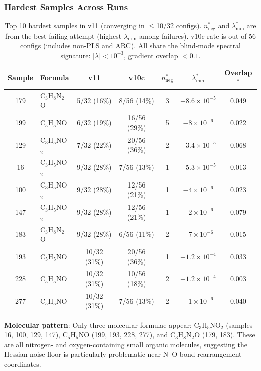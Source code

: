 \documentclass[11pt,a4paper]{article}
\theoremstyle{definition}
\begin{document}
\subsubsection{Hardest Samples Across Runs}
\label{sec:hardest}

\begin{table}[h]
\centering
\caption{Top 10 hardest samples in v11 (converging in $\leq$10/32 configs).
  $n_\text{neg}^*$ and $\lambda_\text{min}^*$ are from the best failing attempt
  (highest $\lambda_\text{min}$ among failures).  v10c rate is out of 56 configs
  (includes non-PLS and ARC).  All share the blind-mode spectral signature:
  $|\lambda| < 10^{-3}$, gradient overlap $<0.1$.}
\label{tab:hardest-10}
\begin{tabular}{clccccc}
\toprule
Sample & Formula & v11 & v10c & $n_\text{neg}^*$ & $\lambda_\text{min}^*$ & Overlap$^*$ \\
\midrule
179 & C$_3$H$_8$N$_2$O & 5/32 (16\%) & 8/56 (14\%) & 3 & $-8.6\times10^{-5}$ & 0.049 \\
199 & C$_5$H$_5$NO      & 6/32 (19\%) & 16/56 (29\%) & 5 & $-8\times10^{-6}$ & 0.022 \\
129 & C$_3$H$_5$NO$_2$  & 7/32 (22\%) & 20/56 (36\%) & 2 & $-3.4\times10^{-5}$ & 0.068 \\
16  & C$_3$H$_5$NO$_2$  & 9/32 (28\%) & 7/56 (13\%) & 1 & $-5.3\times10^{-5}$ & 0.013 \\
100 & C$_3$H$_5$NO$_2$  & 9/32 (28\%) & 12/56 (21\%) & 1 & $-4\times10^{-6}$ & 0.023 \\
147 & C$_3$H$_5$NO$_2$  & 9/32 (28\%) & 12/56 (21\%) & 1 & $-2\times10^{-6}$ & 0.079 \\
183 & C$_3$H$_8$N$_2$O  & 9/32 (28\%) & 6/56 (11\%) & 2 & $-7\times10^{-6}$ & 0.015 \\
193 & C$_5$H$_5$NO      & 10/32 (31\%) & 20/56 (36\%) & 1 & $-1.2\times10^{-4}$ & 0.033 \\
228 & C$_5$H$_5$NO      & 10/32 (31\%) & 10/56 (18\%) & 2 & $-1.2\times10^{-4}$ & 0.003 \\
277 & C$_5$H$_5$NO      & 10/32 (31\%) & 7/56 (13\%) & 2 & $-1\times10^{-6}$ & 0.040 \\
\bottomrule
\end{tabular}
\end{table}

\textbf{Molecular pattern}: Only three molecular formulae appear:
C$_3$H$_5$NO$_2$ (samples 16, 100, 129, 147), C$_5$H$_5$NO (199, 193,
228, 277), and C$_3$H$_8$N$_2$O (179, 183).  These are all nitrogen- and
oxygen-containing small organic molecules, suggesting the Hessian noise
floor is particularly problematic near N--O bond rearrangement coordinates.
\end{document}

